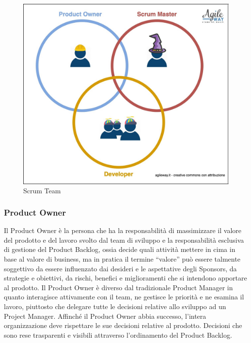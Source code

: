 \documentclass{article}
\begin{document}
\begin{figure}[htbp]
    \centering
    \includegraphics[width=\textwidth]{./imgs/scrum-team.jpg}
    \caption{Scrum Team}
\end{figure}

\newpage
\subsubsection{Product Owner}\label{product-owner}
Il Product Owner è la persona che ha la responsabilità di massimizzare il valore del prodotto e del lavoro svolto dal team di sviluppo 
e la responsabilità esclusiva di gestione del Product Backlog, ossia decide quali attività mettere in cima in base al valore di business, 
ma in pratica il termine ``valore'' può essere talmente soggettivo da essere influenzato dai desideri e le aspettative degli Sponsors, 
da strategie e obiettivi, da rischi, benefici e miglioramenti che si intendono apportare al prodotto.
Il Product Owner è diverso dal tradizionale Product Manager in quanto interagisce attivamente con il team, ne gestisce 
le priorità e ne esamina il lavoro, piuttosto che delegare tutte le decisioni relative allo sviluppo ad un Project Manager. 
Affinché il Product Owner abbia successo, l'intera organizzazione deve rispettare le sue decisioni relative al prodotto. Decisioni che 
sono rese trasparenti e visibili attraverso l'ordinamento del Product Backlog.
\end{document}

